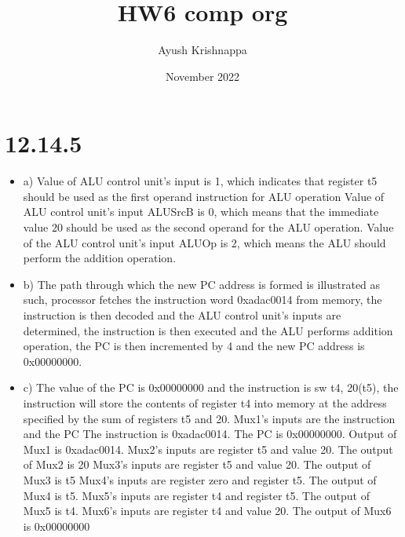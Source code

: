 \documentclass{article}
\title{HW6 comp org}
\author{Ayush Krishnappa}
\date{November 2022}
\begin{document}
\maketitle

\section{12.14.5}

\begin{itemize}
    \item a) Value of ALU control unit's input is 1, which indicates that register t5 should be used as the first operand instruction for ALU operation\newline
    Value of ALU control unit's input ALUSrcB is 0, which means that the immediate value 20 should be used as the second operand for the ALU operation. \newline
    Value of the ALU control unit's input ALUOp is 2, which means the ALU should perform the addition operation.\newline
    
    \item b) The path through which the new PC address is formed is illustrated as such, processor fetches the instruction word 0xadac0014 from memory, the instruction is then decoded and the ALU control unit's inputs are determined, the instruction is then executed and the ALU performs addition operation, the PC is then incremented by 4 and the new PC address is 0x00000000. \newline
    
    \item c) The value of the PC is 0x00000000 and the instruction is sw t4, 20(t5), the instruction will store the contents of register t4 into memory at the address specified by the sum of registers t5 and 20.\newline
    Mux1's inputs are the instruction and the PC The instruction is 0xadac0014. The PC is 0x00000000. \newline
    Output of Mux1 is 0xadac0014. \newline
    Mux2's inputs are register t5 and value 20. The output of Mux2 is 20 \newline
    Mux3's inputs are register t5 and value 20. The output of Mux3 is t5 \newline
    Mux4's inputs are register zero and register t5. The output of Mux4 is t5. \newline
    Mux5's inputs are register t4 and register t5. The output of Mux5 is t4. \newline
    Mux6's inputs are register t4 and value 20. The output of Mux6 is 0x00000000 \newline
    

\end{itemize}
\end{document}
